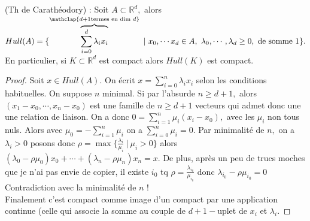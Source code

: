 \begin{remarque}
    (Th de Carathéodory) : Soit $A\subset \mathbb{R} ^d,$ alors $Hull(A)=\{\overbrace{\sum\limits_{i=0}^{d} \lambda_ix_i}^{\mathclap{d+1 \text{termes en dim }d}}\ |\ x_0,\cdots x_d\in A, \ \lambda_0,\cdots, \lambda_d\ge 0, \text{ de somme 1}\} .$\\
    En particulier, si $K\subset \mathbb{R} ^d$ est compact alors $Hull(K)$ est compact.
\end{remarque}
\begin{proof}
    Soit $x\in Hull(A).$ On écrit $x=\sum\limits_{i=0}^{n} \lambda_ix_i$ selon les conditions habituelles. On suppose $n$ minimal. Si par l'absurde $n\ge d+1,$ alors $(x_1-x_0,\cdots, x_n-x_0)$ est une famille de $n\ge d+1$ vecteurs qui admet donc une une relation de liaison. On a donc $0=\sum\limits_{i=1}^{n} \mu_i(x_i-x_0),$ avec les $\mu_i$ non tous nuls. Alors avec $\mu_0=-\sum\limits_{i=1}^{n} \mu_i$ on a $\sum\limits_{i=0}^{n} \mu_i=0$. Par minimalité de $n,$  on a $\lambda _i>0$ posons donc $\rho=\max \{\frac{\lambda_i}{\mu_i}\ |\ \mu_i>0\} $ alors $(\lambda_0-\rho\mu_0)x_0+\cdots+(\lambda_n-\rho\mu_n)x_n=x$. De plus, après un peu de trucs moches que je n'ai pas envie de copier, il existe $i_0$ tq $\rho=\frac{\lambda_{i_0}}{\mu_{i_0}}$ donc $\lambda_{i_0}-\rho\mu_{i_0}=0$ Contradiction avec la minimalité de $n$ !\\
    Finalement c'est compact comme image d'un compact par une application continue (celle qui associe la somme au couple de $d+1-$uplet de $x_i$ et $\lambda_i.$
\end{proof}

